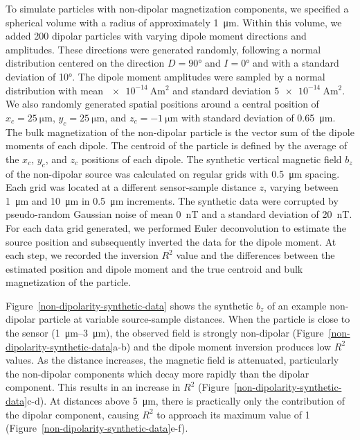 To simulate particles with non-dipolar magnetization components, we specified a spherical volume with a radius of approximately \qty{1}{\um}.
Within this volume, we added 200 dipolar particles with varying dipole moment directions and amplitudes.
These directions were generated randomly, following a normal distribution centered on the direction $D=\ang{90}$ and $I=\ang{0}$ and with a standard deviation of \ang{10}.
The dipole moment amplitudes were sampled by a normal distribution with mean $\qty{e-14}{\ampere\m\squared}$ and standard deviation $\qty{5e-14}{\ampere\m\squared}$.
We also randomly generated spatial positions around a central position of $x_c=\qty{25}{\um}$, $y_c=\qty{25}{\um}$, and $z_c=\qty{-1}{\um}$ with standard deviation of \qty{0.65}{\um}.
The bulk magnetization of the non-dipolar particle is the vector sum of the dipole moments of each dipole.
The centroid of the particle is defined by the average of the $x_c$, $y_c$, and $z_c$ positions of each dipole.
The synthetic vertical magnetic field $b_z$ of the non-dipolar source was calculated on regular grids with \qty{0.5}{\um} spacing.
Each grid was located at a different sensor-sample distance $z$, varying between \qty{1}{\um} and \qty{10}{\um} in \qty{0.5}{\um} increments.
The synthetic data were corrupted by pseudo-random Gaussian noise of mean \qty{0}{\nano\tesla} and a standard deviation of \qty{20}{\nano\tesla}.
For each data grid generated, we performed Euler deconvolution to estimate the source position and subsequently inverted the data for the dipole moment.
At each step, we recorded the inversion $R^2$ value and the differences between the estimated position and dipole moment and the true centroid and bulk magnetization of the particle.

Figure~\ref{non-dipolarity-synthetic-data} shows the synthetic $b_z$ of an example non-dipolar particle at variable source-sample distances.
When the particle is close to the sensor (\qtyrange{1}{3}{\um}), the observed field is strongly non-dipolar (Figure~\ref{non-dipolarity-synthetic-data}a-b) and the dipole moment inversion produces low $R^2$ values.
As the distance increases, the magnetic field is attenuated, particularly the non-dipolar components which decay more rapidly than the dipolar component.
This results in an increase in $R^2$ (Figure~\ref{non-dipolarity-synthetic-data}c-d).
At distances above \qty{5}{\um}, there is practically only the contribution of the dipolar component, causing $R^2$ to approach its maximum value of 1 (Figure~\ref{non-dipolarity-synthetic-data}e-f).

